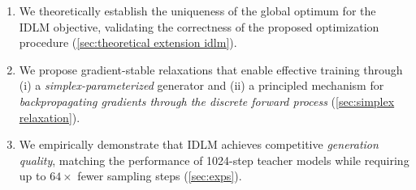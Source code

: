   \begin{enumerate}
    \setlength{\itemsep}{1pt}
    \setlength{\parskip}{1pt}
    \item We theoretically establish the uniqueness of the global optimum for the IDLM objective, validating the correctness of the proposed optimization procedure (\wasyparagraph\ref{sec:theoretical extension idlm}).

    \item We propose gradient-stable relaxations that enable effective training through (i) a \emph{simplex-parameterized} generator and (ii) a principled mechanism for \emph{backpropagating gradients through the discrete forward process} (\wasyparagraph\ref{sec:simplex relaxation}).
    \item We empirically demonstrate that IDLM achieves competitive \emph{generation quality}, matching the performance of 1024-step teacher models while requiring up to $64\times$ fewer sampling steps (\wasyparagraph\ref{sec:exps}).
  \end{enumerate}

